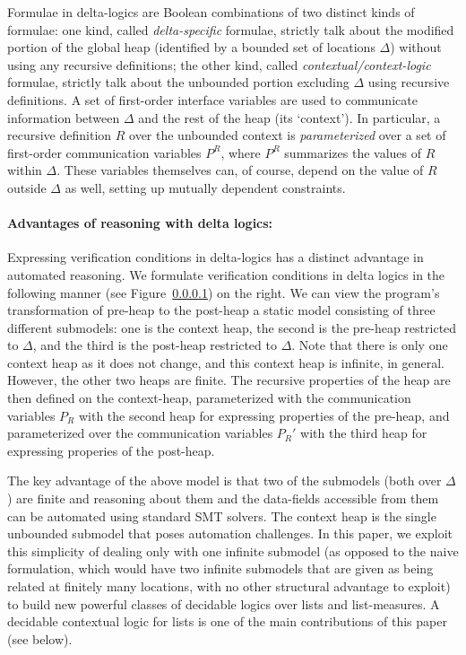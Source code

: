 \documentclass[acmsmall,review,anonymous]{acmart}\settopmatter{printfolios=true,printccs=false,printacmref=false}
\begin{document}
Formulae in delta-logics are Boolean combinations of two distinct kinds of formulae: one kind, called \emph{delta-specific} formulae, strictly talk about the modified portion of the global heap (identified by a bounded set of locations $\Delta$) without using
any recursive definitions; the other 
kind, called \emph{contextual/context-logic} formulae, strictly talk about the unbounded portion excluding $\Delta$ using recursive definitions.
A set of first-order interface variables are used to communicate information between $\Delta$ and the rest of the heap (its `context'). In particular, a recursive definition $R$ over the unbounded context is \emph{parameterized}
over a set of first-order communication variables $P^R$, where $P^R$ summarizes the values of $R$ within $\Delta$. These variables themselves can, of course, depend on the value of $R$ outside $\Delta$ as well, setting up mutually dependent constraints. 

\paragraph{Advantages of reasoning with delta logics:}
Expressing verification conditions in delta-logics has a distinct advantage in automated reasoning. We formulate verification conditions in delta logics in the following manner (see Figure~\ref{}) on the right.
We can view the program's transformation of pre-heap to the post-heap a static model consisting of three different submodels: one is the context heap, the second is the pre-heap restricted to $\Delta$, and the third is the post-heap restricted to  $\Delta$.
Note that there is only one context heap as it does not change, and this context heap is infinite, in general. However, the other two heaps are finite. The recursive properties of the heap are then defined  on the context-heap, parameterized with the communication variables $P_R$ with the second heap for expressing properties of the pre-heap, and parameterized over the communication variables $P_R'$ with the third heap for expressing properies of the post-heap.

The key advantage of the above model is that
two of the submodels (both over $\Delta$) are finite and reasoning about them and the data-fields accessible from them can be automated using standard SMT solvers.
The context heap is the single unbounded submodel that poses automation challenges. In this paper, we exploit this simplicity of dealing only with one infinite submodel (as opposed to the naive formulation, which would have two infinite submodels that are given as being related at finitely many locations, with no other structural advantage to exploit) to build new powerful classes of decidable logics over lists and list-measures. A decidable contextual logic for lists is one of the main contributions of this paper (see below).
\end{document}

